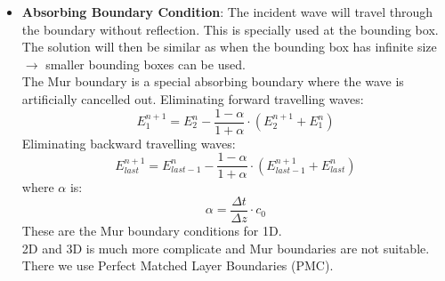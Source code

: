 \begin{itemize}
	\item \textbf{Absorbing Boundary Condition}: The incident wave will travel through the boundary without reflection. This is specially used at the bounding box. The solution will then be similar as when the bounding box has infinite size $\rightarrow$ smaller bounding boxes can be used.\\
	The Mur boundary is a special absorbing boundary where the wave is artificially cancelled out. Eliminating forward travelling waves: 
	\begin{equation}
	E^{n+1}_1 = E^n_2 - \frac{1-\alpha}{1 + \alpha} \cdot (E^{n+1}_2 + E^n_1 )
	\end{equation}
	Eliminating backward travelling waves:
	\begin{equation}
		E^{n+1}_{last} = E^n_{last-1} - \frac{1-\alpha}{1 + \alpha} \cdot (E^{n+1}_{last-1} + E^n_{last} )
	\end{equation}
	where $\alpha$ is:
	\begin{equation}
		\alpha = \frac{\Delta t}{\Delta z}\cdot c_0
	\end{equation}
	These are the Mur boundary conditions for 1D. \\2D and 3D is much more complicate and Mur boundaries are not suitable. There we use Perfect Matched Layer Boundaries (PMC).
\end{itemize}

